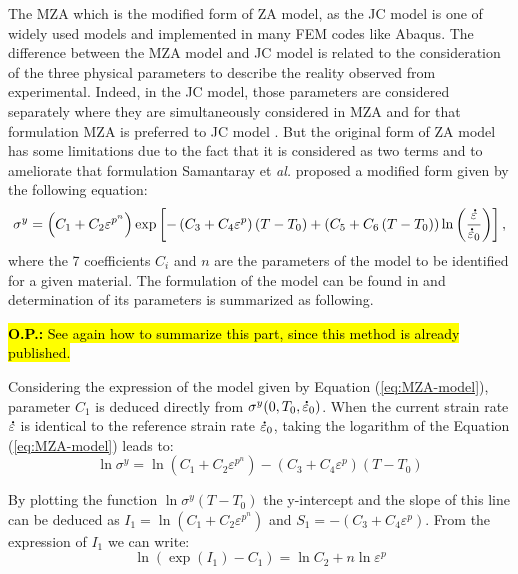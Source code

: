 \documentclass[twoside,english,1p,final,sort&compress]{elsarticle}
\makeatletter
\theoremstyle{plain}
\DeclareRobustCommand{\mdot}[1]{\accentset{\mbox{\bfseries .}}{#1}}
\DeclareRobustCommand{\eal}{et \emph{al.}\@\xspace}
\DeclareRobustCommand{\OP}[1]{\begingroup\sethlcolor{VWyellow}\textcolor{red}{\hl{\textbf{O.P.:} #1}}\endgroup}
\makeatother
\begin{document}
The MZA which is the modified form of ZA model, as the JC model is one of widely used models and implemented in many FEM codes like Abaqus.
The difference between the MZA model and JC model is related to the consideration of the three physical parameters to describe the reality observed from experimental.
Indeed, in the JC model, those parameters are considered separately where they are simultaneously considered in MZA and for that formulation MZA is preferred to JC model \cite{Hull-2011}.
But the original form of ZA model has some limitations due to the fact that it is considered as two terms and to ameliorate that formulation Samantaray \eal \cite{Samantaray-2009} proposed a modified form given by the following equation:
\begin{equation}
\label{eq:MZA-model}
\sigma^y = \left(C_{1}+C_{2}\varepsilon^{p^n}\right) \exp\left[-\left(C_{3}+C_{4}\varepsilon^p\right)\left(T-T_0\right) + \left(C_{5}+C_{6}\left(T-T_0\right)\right)\ln\left( \frac{\mdot\varepsilon}{\mdot{\varepsilon}_0}\right)\right],
\end{equation}
where the 7 coefficients $C_i$ and $n$ are the parameters of the model to be identified for a given material.
The formulation of the model can be found in \cite{Samantaray-2009} and determination of its parameters is summarized as following.

\OP{See again how to summarize this part, since this method is already published.}

Considering the expression of the model given by Equation (\ref{eq:MZA-model}), parameter $C_1$ is deduced directly from $\sigma^y(0,T_0,\mdot{\varepsilon}_0)$.
When the current strain rate $\mdot\varepsilon$ is identical to the reference strain rate $\mdot{\varepsilon}_0$, taking the logarithm of the Equation (\ref{eq:MZA-model}) leads to:
\begin{equation}
\ln\sigma^y = \ln\left(C_{1}+C_{2}\varepsilon^{p^n}\right)-\left(C_{3}+C_{4}\varepsilon^p\right)\left(T-T_0\right)
\end{equation}

By plotting the function $\ln\sigma^y\left(T-T_0\right)$ the y-intercept and the slope of this line can be deduced as $I_1=\ln\left(C_1+C_2\varepsilon^{p^n}\right)$ and $S_1=-\left(C_3+C_4\varepsilon^p\right)$.
From the expression of $I_1$ we can write:
\begin{equation}
\ln\left(\exp(I_1)-C_1\right) = \ln C_2+n\ln\varepsilon^p
\end{equation}
\end{document}
